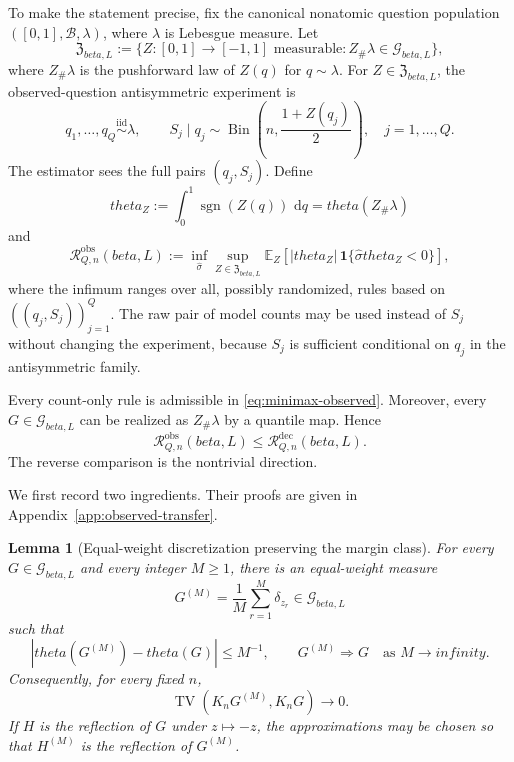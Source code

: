 \documentclass[11pt]{article}
\def\beta{beta}%
\def\theta{theta}%
\def\infty{infinity}%
\newtheorem{lemma}[theorem]{Lemma}
\newcommand{\E}{\mathbb E}
\newcommand{\one}{\mathbf 1}
\newcommand{\sgn}{\operatorname{sgn}}
\newcommand{\TV}{\operatorname{TV}}
\newcommand{\Bin}{\operatorname{Bin}}
\newcommand{\calG}{\mathcal G}
\newcommand{\calR}{\mathcal R}
\newcommand{\dd}{\,\mathrm d}
\begin{document}
To make the statement precise, fix the canonical nonatomic question population $([0,1],\mathcal B,\lambda)$, where $\lambda$ is Lebesgue measure.  Let
\[
\mathfrak Z_{\beta,L}
:=
\{Z:[0,1]\to[-1,1]\text{ measurable}:Z_\#\lambda\in\calG_{\beta,L}\},
\]
where $Z_\#\lambda$ is the pushforward law of $Z(q)$ for $q\sim\lambda$.  For $Z\in\mathfrak Z_{\beta,L}$, the observed-question antisymmetric experiment is
\begin{equation}
\label{eq:full-observed-scalar}
q_1,\dots,q_Q\overset{\mathrm{iid}}{\sim}\lambda,
\qquad
S_j\mid q_j
\sim
\Bin\!\left(n,\frac{1+Z(q_j)}2\right),
\quad j=1,\dots,Q.
\end{equation}
The estimator sees the full pairs $(q_j,S_j)$.  Define
\[
\theta_Z
:=
\int_0^1\sgn(Z(q))\,\dd q
=
\theta(Z_\#\lambda)
\]
and
\begin{equation}
\label{eq:minimax-observed}
\calR^{\mathrm{obs}}_{Q,n}(\beta,L)
:=
\inf_{\widehat\sigma}
\sup_{Z\in\mathfrak Z_{\beta,L}}
\E_Z\!\left[
|\theta_Z|\,
\one\{\widehat\sigma\theta_Z<0\}
\right],
\end{equation}
where the infimum ranges over all, possibly randomized, rules based on $((q_j,S_j))_{j=1}^Q$.  The raw pair of model counts may be used instead of $S_j$ without changing the experiment, because $S_j$ is sufficient conditional on $q_j$ in the antisymmetric family.

Every count-only rule is admissible in \eqref{eq:minimax-observed}.  Moreover, every $G\in\calG_{\beta,L}$ can be realized as $Z_\#\lambda$ by a quantile map.  Hence
\begin{equation}
\label{eq:obs-le-count}
\calR^{\mathrm{obs}}_{Q,n}(\beta,L)
\le
\calR^{\mathrm{dec}}_{Q,n}(\beta,L).
\end{equation}
The reverse comparison is the nontrivial direction.

We first record two ingredients.  Their proofs are given in Appendix~\ref{app:observed-transfer}.

\begin{lemma}[Equal-weight discretization preserving the margin class]
\label{lem:equal-weight-discretization}
For every $G\in\calG_{\beta,L}$ and every integer $M\ge1$, there is an equal-weight measure
\[
G^{(M)}
=
\frac1M\sum_{r=1}^M\delta_{z_r}
\in\calG_{\beta,L}
\]
such that
\[
|\theta(G^{(M)})-\theta(G)|\le M^{-1},
\qquad
G^{(M)}\Rightarrow G
\quad\text{as }M\to\infty.
\]
Consequently, for every fixed $n$,
\[
\TV(K_nG^{(M)},K_nG)\to0.
\]
If $H$ is the reflection of $G$ under $z\mapsto-z$, the approximations may be chosen so that $H^{(M)}$ is the reflection of $G^{(M)}$.
\end{lemma}
\end{document}
